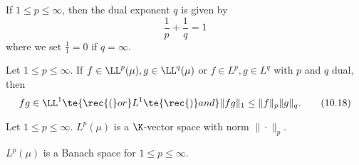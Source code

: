 \begin{definition}\label{x.vii}
	If $1\leq p\leq\infty$, then the dual exponent $q$ is given by 
	\[\frac{1}{p}+\frac{1}{q}=1\tag{10.17}\label{10.17}\]
	where we set $\frac{1}{1}=0$ if $q=\infty$.
\end{definition}

\begin{thm}[Hölder]\label{x.viii}
	Let $1\leq p\leq\infty$. If $f\in\LL^p(\mu),g\in\LL^q(\mu)$ \rec{(}or $f\in L^p,g\in L^q$\rec{)} with $p$ and $q$ dual, then
	\[fg\in\LL^1\te{ \rec{(}or }L^1\te{\rec{)} and }\|fg\|_1\leq\|f\|_p\|g\|_q.\tag{10.18}\label{10.18}\]
\end{thm}

\begin{cor}[Minkowski]\label{x.ix}
	Let $1\leq p\leq\infty$. $L^p(\mu)$ is a $\K$-vector space with norm $\|\cdot\|_p$.
\end{cor}

\begin{thm}\label{x.x}
	$L^p(\mu)$ is a Banach space for $1\leq p\leq\infty$.
\end{thm}